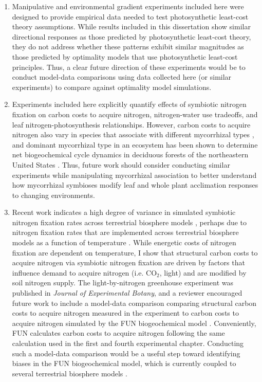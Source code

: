 \begin{enumerate}
    \item Manipulative and environmental gradient experiments included here were designed to provide empirical data needed to test photosynthetic least-cost theory assumptions. While results included in this dissertation show similar directional responses as those predicted by photosynthetic least-cost theory, they do not address whether these patterns exhibit similar magnitudes as those predicted by optimality models that use photosynthetic least-cost principles. Thus, a clear future direction of these experiments would be to conduct model-data comparisons using data collected here (or similar experiments) to compare against optimality model simulations.
    
    \item Experiments included here explicitly quantify effects of symbiotic nitrogen fixation on carbon costs to acquire nitrogen, nitrogen-water use tradeoffs, and leaf nitrogen-photosynthesis relationships. However, carbon costs to acquire nitrogen also vary in species that associate with different mycorrhizal types , and dominant mycorrhizal type in an ecosystem has been shown to determine net biogeochemical cycle dynamics in deciduous forests of the northeastern United States . Thus, future work should consider conducting similar experiments while manipulating mycorrhizal association to better understand how mycorrhizal symbioses modify leaf and whole plant acclimation responses to changing environments. 
    
    \item Recent work indicates a high degree of variance in simulated symbiotic nitrogen fixation rates across terrestrial biosphere models , perhaps due to nitrogen fixation rates that are implemented across terrestrial biosphere models as a function of temperature . While energetic costs of nitrogen fixation are dependent on temperature, I show that structural carbon costs to acquire nitrogen via symbiotic nitrogen fixation are driven by factors that influence demand to acquire nitrogen (i.e. CO$_2$, light) and are modified by soil nitrogen supply. The light-by-nitrogen greenhouse experiment was published in \textit{Journal of Experimental Botany}, and a reviewer encouraged future work to include a model-data comparison comparing structural carbon costs to acquire nitrogen measured in the experiment to carbon costs to acquire nitrogen simulated by the FUN biogeochemical model . Conveniently, FUN calculates carbon costs to acquire nitrogen following the same calculation used in the first and fourth experimental chapter. Conducting such a model-data comparison would be a useful step toward identifying biases in the FUN biogeochemical model, which is currently coupled to several terrestrial biosphere models .


\end{enumerate}
